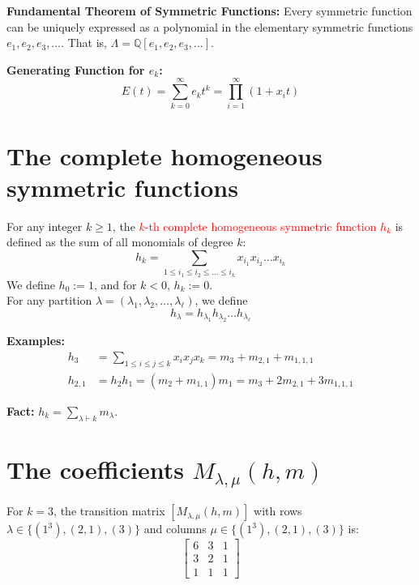 \documentclass[12pt]{memoir}
\begin{document}
\begin{ptcb}
\textbf{Fundamental Theorem of Symmetric Functions:} Every symmetric function can be uniquely expressed as a polynomial in the elementary symmetric functions $e_1, e_2, e_3, \dots$. That is, $\Lambda = \mathbb{Q}[e_1, e_2, e_3, \dots]$.
\end{ptcb}

\textbf{Generating Function for $e_k$:}
\[
E(t) = \sum_{k=0}^\infty e_k t^k = \prod_{i=1}^\infty (1 + x_i t)
\]

\newpage

\section{The complete homogeneous symmetric functions}

\begin{ptcb}
\begin{Def}
For any integer $k \ge 1$, the \textcolor{red}{$k$-th complete homogeneous symmetric function $h_k$} is defined as the sum of all monomials of degree $k$:
\[
h_k = \sum_{1 \le i_1 \le i_2 \le \dots \le i_k} x_{i_1} x_{i_2} \dots x_{i_k}
\]
We define $h_0 := 1$, and for $k < 0$, $h_k := 0$.\\
For any partition $\lambda = (\lambda_1, \lambda_2, \dots, \lambda_\ell)$, we define
\[
h_\lambda = h_{\lambda_1} h_{\lambda_2} \dots h_{\lambda_\ell}
\]
\end{Def}
\end{ptcb}

\textcolor{verdeUCR}{\textbf{Examples:}}
\begin{align*}
    h_3 &= \sum_{1 \le i \le j \le k} x_i x_j x_k = m_3 + m_{2,1} + m_{1,1,1}\\[0.5em]
    h_{2,1} &= h_2 h_1 = (m_2 + m_{1,1}) m_1 = m_3 + 2m_{2,1} + 3m_{1,1,1}
\end{align*}

\textbf{Fact:} $h_k = \sum_{\lambda \vdash k} m_\lambda$.

\newpage

\section{The coefficients \texorpdfstring{$M_{\lambda,\mu}(h,m)$}{M\_\{lambda,mu\}(h,m)}}

For $k = 3$, the transition matrix $[M_{\lambda,\mu}(h,m)]$ with rows $\lambda \in \{(1^3), (2,1), (3)\}$ and columns $\mu \in \{(1^3), (2,1), (3)\}$ is:
\[
\begin{bmatrix}
6 & 3 & 1 \\
3 & 2 & 1 \\
1 & 1 & 1
\end{bmatrix}
\]
\end{document}

